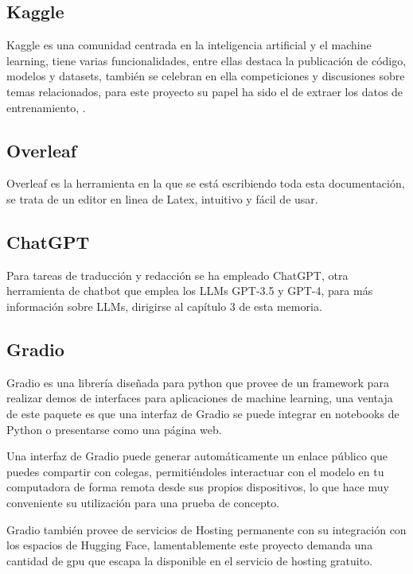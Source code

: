 \subsection{Kaggle}

Kaggle es una comunidad centrada en la inteligencia artificial y el machine learning, tiene varias funcionalidades, entre ellas destaca la publicación de código, modelos y datasets, también se celebran en ella competiciones y discusiones sobre temas relacionados, para este proyecto su papel ha sido el de extraer los datos de entrenamiento, \cite{Anandhu_H_abstracts_2023}.

\subsection{Overleaf}

Overleaf es la herramienta en la que se está escribiendo toda esta documentación, se trata de un editor en linea de Latex, intuitivo y fácil de usar.

\subsection{ChatGPT}

Para tareas de traducción y redacción se ha empleado ChatGPT, otra herramienta de chatbot que emplea los LLMs GPT-3.5 y GPT-4, para más información sobre LLMs, dirigirse al capítulo 3 de esta memoria.

\subsection{Gradio}

Gradio es una librería diseñada para python que provee de un framework para realizar demos de interfaces para aplicaciones de machine learning, una ventaja de este paquete es que una interfaz de Gradio se puede integrar en notebooks de Python o presentarse como una página web.

Una interfaz de Gradio puede generar automáticamente un enlace público que puedes compartir con colegas, permitiéndoles interactuar con el modelo en tu computadora de forma remota desde sus propios dispositivos, lo que hace muy conveniente su utilización para una prueba de concepto.

Gradio también provee de servicios de Hosting permanente con su integración con los espacios de Hugging Face, lamentablemente este proyecto demanda una cantidad de gpu que escapa la disponible en el servicio de hosting gratuito.